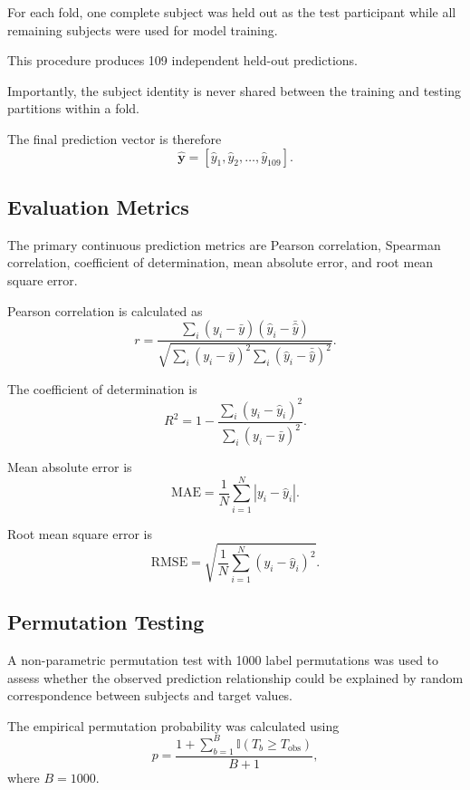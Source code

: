 \documentclass[conference]{IEEEtran}
\begin{document}
For each fold, one complete subject was held out as the test participant while all remaining subjects were used for model training.

This procedure produces 109 independent held-out predictions.

Importantly, the subject identity is never shared between the training and testing partitions within a fold.

The final prediction vector is therefore
\begin{equation}
\mathbf{\hat{y}} = [\hat{y}_1, \hat{y}_2, \dots, \hat{y}_{109}].
\end{equation}

\subsection{Evaluation Metrics}
The primary continuous prediction metrics are Pearson correlation, Spearman correlation, coefficient of determination, mean absolute error, and root mean square error.

Pearson correlation is calculated as
\begin{equation}
r = \frac{\sum_i (y_i - \bar{y})(\hat{y}_i - \bar{\hat{y}})}{\sqrt{\sum_i (y_i - \bar{y})^2 \sum_i (\hat{y}_i - \bar{\hat{y}})^2}}.
\end{equation}

The coefficient of determination is
\begin{equation}
R^2 = 1 - \frac{\sum_i (y_i - \hat{y}_i)^2}{\sum_i (y_i - \bar{y})^2}.
\end{equation}

Mean absolute error is
\begin{equation}
\text{MAE} = \frac{1}{N} \sum_{i=1}^{N} |y_i - \hat{y}_i|.
\end{equation}

Root mean square error is
\begin{equation}
\text{RMSE} = \sqrt{\frac{1}{N} \sum_{i=1}^{N} (y_i - \hat{y}_i)^2}.
\end{equation}

\subsection{Permutation Testing}
A non-parametric permutation test with 1000 label permutations was used to assess whether the observed prediction relationship could be explained by random correspondence between subjects and target values.

The empirical permutation probability was calculated using
\begin{equation}
p = \frac{1 + \sum_{b=1}^{B} \mathbb{I}(T_b \geq T_{\text{obs}})}{B + 1},
\end{equation}
where $B = 1000$.
\end{document}
